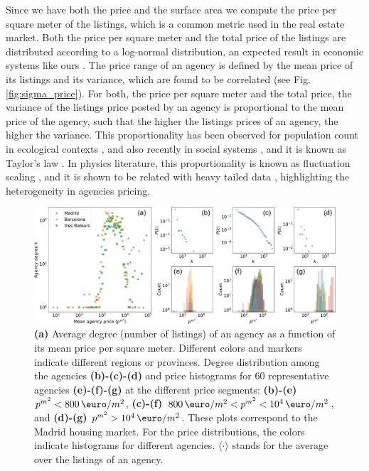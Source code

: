 Since we have both the price and the surface area we compute the price per square meter of the listings, which is a common metric used in the real estate market. Both the price per square meter and the total price of the listings are distributed according to a log-normal distribution, an expected result in economic systems like ours \cite{ibragimov2015heavy}. The price range of an agency is defined by the mean price of its listings and its variance, which are found to be correlated (see Fig. \ref{fig:sigma_price}). For both, the price per square meter and the total price, the variance of the listings price posted by an agency is proportional to the mean price of the agency, such that the higher the listings prices of an agency, the higher the variance. This proportionality has been observed for population count in ecological contexts \cite{anderson1982variability, kilpatrick2003species}, and also recently in social systems \cite{chen2020scaling}, and it is known as Taylor's law \cite{taylor1961aggregation,eisler2008fluctuation}. In physics literature, this proportionality is known as fluctuation scaling \cite{eisler2008fluctuation}, and it is shown to be related with heavy tailed data \cite{brown2021taylor}, highlighting the heterogeneity in agencies pricing.

\begin{figure}
    \centering
    \includegraphics[width =\textwidth]{Figs/Idealista_dynamics/panel_price.pdf}
	\caption[Price segmentation by the degree.]{\textbf{(a)} Average degree (number of listings) of an agency as a function of its mean price per square meter. Different colors and markers indicate different regions or provinces. Degree distribution among the agencies \textbf{(b)-(c)-(d)} and price histograms for 60 representative agencies \textbf{(e)-(f)-(g)} at the different price segments: \textbf{(b)-(e)} $p^{{m}^2} < 800 \, \textup{\euro} / m^2$, \textbf{(c)-(f)} $800 \, \textup{\euro}  / m^2 < p^{{m}^2} < 10^4 \, \textup{\euro}  / m^2$, and \textbf{(d)-(g)} $p^{{m}^2} > 10^4 \, \textup{\euro}  / m^2$. These plots correspond to the Madrid housing market. For the price distributions, the colors indicate histograms for different agencies. $\langle \cdot \rangle$ stands for the average over the listings of an agency. \label{fig:panel_price}}
\end{figure}

